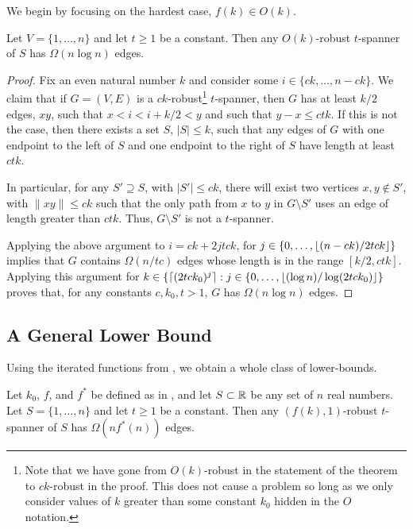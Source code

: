 \documentclass{patmorin}
\begin{document}
We begin by focusing on the hardest case, $f(k) \in O(k)$.

\begin{thm}
Let $V=\{1,\ldots,n\}$ and let $t\ge 1$ be a constant.  Then any
$O(k)$-robust $t$-spanner of $S$ has $\Omega(n\log n)$ edges.
\end{thm}

\begin{proof}
Fix an even natural number $k$ and consider some $i\in\{ck,\ldots,n-ck\}$.
We claim that if $G=(V,E)$ is a $ck$-robust\footnote{Note that we
have gone from $O(k)$-robust in the statement of the theorem to
$ck$-robust in the proof.  This does not cause a problem so long
as we only consider values of $k$ greater than some constant $k_0$
hidden in the $O$ notation.} $t$-spanner, then $G$ has at least $k/2$
edges, $xy$, such that $x < i < i+k/2 < y$ and such that $y-x \le ctk$.
If this is not the case, then there exists a set $S$, $|S|\le k$,
such that any edges of $G$ with one endpoint to the left of $S$
and one endpoint to the right of $S$ have length at least $ctk$.

In particular, for any $S'\supseteq S$, with $|S'|\le ck$, there will
exist two vertices $x,y\not\in S'$, with $\|xy\|\le ck$ such that the
only path from $x$ to $y$ in $G\setminus S'$ uses an edge of length
greater than $ctk$.  Thus, $G\setminus S'$ is not a $t$-spanner.

Applying the above argument to $i=ck+2jtck$, for
$j\in\{0,\ldots,{\lfloor (n-ck)/2tck \rfloor}\}$ implies that $G$ contains
$\Omega(n/tc)$ edges whose length is in the range $[k/2,ctk]$.  Applying
this argument for $k\in\{{\lceil (2tck_0)^{j} \rceil} : j\in\{0,\ldots,{\lfloor (\log
n)/\log(2tck_0) \rfloor}\}$ proves that, for any constants $c,k_0,t>1$, $G$
has $\Omega(n\log n)$ edges.
\end{proof}


\subsection{A General Lower Bound}

Using the iterated functions from , we obtain a whole
class of lower-bounds.

\begin{thm}
Let $k_0$, $f$, and $f^*$ be defined as in , and let
$S\subset \mathbb{R}$ be any set of $n$ real numbers.  Let $S=\{1,\ldots,n\}$
and let $t\ge 1$ be a constant.  Then any $(f(k),1)$-robust $t$-spanner
of $S$ has $\Omega(nf^*(n))$ edges.
\end{thm}
\end{document}
